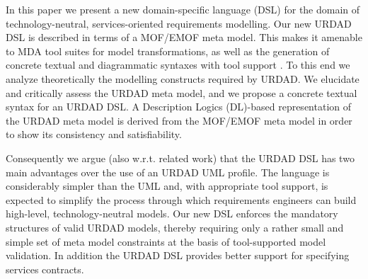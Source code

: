 In this paper we present a new domain-specific language (DSL) for the domain of technology-neutral, services-oriented requirements modelling. Our new URDAD DSL is described in terms of a MOF/EMOF meta model. This makes it amenable to MDA tool suites for model transformations, as well as the generation of concrete textual and diagrammatic syntaxes with tool support \cite{gronback_model_2008}. To this end we analyze theoretically the modelling constructs required by URDAD. We elucidate and critically assess the URDAD meta model, and we propose a concrete textual syntax for an URDAD DSL. A Description Logics (DL)-based representation of the URDAD meta model is derived from the MOF/EMOF meta model in order to show its consistency and satisfiability.

Consequently we argue (also w.r.t. related work) that the URDAD DSL has two main advantages over the use of an URDAD 
UML profile. The language is considerably simpler than the UML and, with appropriate tool support, is expected to simplify the process through which requirements engineers can build high-level, technology-neutral models. Our new DSL enforces the mandatory structures of valid URDAD models, thereby requiring only a rather small and simple set of meta model constraints at the basis of tool-supported model validation. In addition the URDAD DSL provides better support for specifying services contracts.

